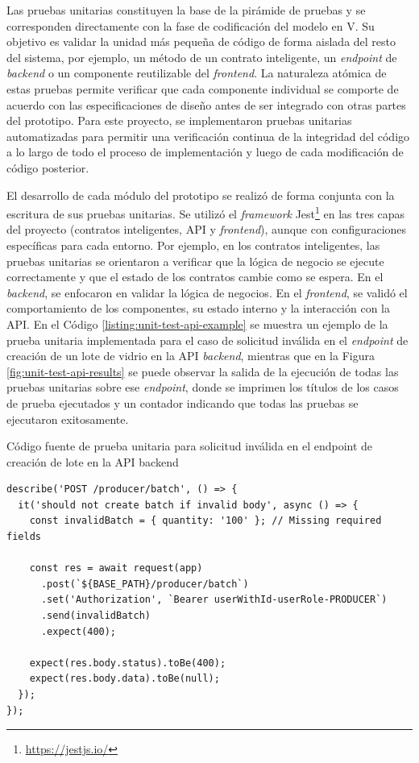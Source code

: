 Las pruebas unitarias constituyen la base de la pirámide de pruebas y se corresponden directamente con la fase de codificación del modelo en V. Su objetivo es validar la unidad más pequeña de código de forma aislada del resto del sistema, por ejemplo, un método de un contrato inteligente, un \textit{\gls{endpoint}} de \textit{backend} o un componente reutilizable del \textit{frontend}. La naturaleza atómica de estas pruebas permite verificar que cada componente individual se comporte de acuerdo con las especificaciones de diseño antes de ser integrado con otras partes del prototipo. Para este proyecto, se implementaron pruebas unitarias automatizadas para permitir una verificación continua de la integridad del código a lo largo de todo el proceso de implementación y luego de cada modificación de código posterior.

El desarrollo de cada módulo del prototipo se realizó de forma conjunta con la escritura de sus pruebas unitarias. Se utilizó el \textit{framework} Jest\footnote{\url{https://jestjs.io/}} en las tres capas del proyecto (contratos inteligentes, API y \textit{\gls{frontend}}), aunque con configuraciones específicas para cada entorno. Por ejemplo, en los contratos inteligentes, las pruebas unitarias se orientaron a verificar que la lógica de negocio se ejecute correctamente y que el estado de los contratos cambie como se espera. En el \textit{\gls{backend}}, se enfocaron en validar la lógica de negocios. En el \textit{frontend}, se validó el comportamiento de los componentes, su estado interno y la interacción con la API. En el Código \ref{listing:unit-test-api-example} se muestra un ejemplo de la prueba unitaria implementada para el caso de solicitud inválida en el \textit{\gls{endpoint}} de creación de un lote de vidrio en la API \textit{backend}, mientras que en la Figura \ref{fig:unit-test-api-results} se puede observar la salida de la ejecución de todas las pruebas unitarias sobre ese \textit{\gls{endpoint}}, donde se imprimen los títulos de los casos de prueba ejecutados y un contador indicando que todas las pruebas se ejecutaron exitosamente.


\begin{listing}[!tp]
\caption{Código fuente de prueba unitaria para solicitud inválida en el endpoint de creación de lote en la API backend}
\label{listing:unit-test-api-example}
\begin{verbatim}
describe('POST /producer/batch', () => {
  it('should not create batch if invalid body', async () => {
    const invalidBatch = { quantity: '100' }; // Missing required fields

    const res = await request(app)
      .post(`${BASE_PATH}/producer/batch`)
      .set('Authorization', `Bearer userWithId-userRole-PRODUCER`)
      .send(invalidBatch)
      .expect(400);

    expect(res.body.status).toBe(400);
    expect(res.body.data).toBe(null);
  });
});
\end{verbatim}
\end{listing}

